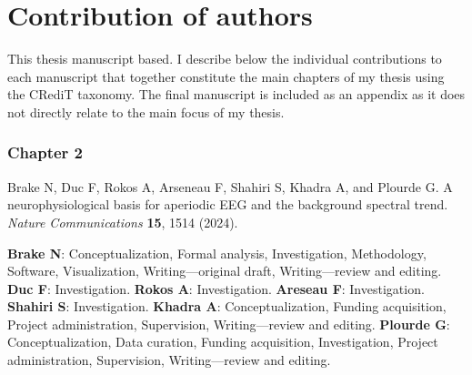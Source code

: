 \chapter*{Contribution of authors}

\setlength{\parindent}{0pt}
\setlength{\parskip}{3pt}

This thesis manuscript based. I describe below the individual contributions to each manuscript that together constitute the main chapters of my thesis using the CRediT taxonomy. The final manuscript is included as an appendix as it does not directly relate to the main focus of my thesis.

\vspace{-.5em}
\subsection*{Chapter 2}

Brake N, Duc F, Rokos A, Arseneau F, Shahiri S, Khadra A, and Plourde G. A neurophysiological basis for aperiodic EEG and the background spectral trend. \textit{Nature Communications} \textbf{15}, 1514 (2024).

{\small \textbf{Brake N}: Conceptualization, Formal analysis, Investigation, Methodology, Software, Visualization, Writing—original draft, Writing—review and editing. \textbf{Duc F}: Investigation. \textbf{Rokos A}: Investigation. \textbf{Areseau F}: Investigation. \textbf{Shahiri S}: Investigation. \textbf{Khadra A}: Conceptualization, Funding acquisition, Project administration, Supervision, Writing—review and editing. \textbf{Plourde G}: Conceptualization, Data curation, Funding acquisition, Investigation, Project administration, Supervision, Writing—review and editing.}




